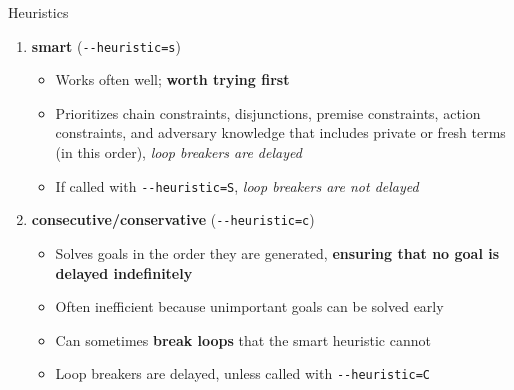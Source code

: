 \documentclass[11pt,aspectratio=169]{beamer}
\begin{document}
\begin{frame}[fragile]{Heuristics}
    \begin{enumerate}
        \item \textbf{smart} (\verb|--heuristic=s|)
        \begin{itemize}
            \item Works often well; \textbf{worth trying first}
            \item Prioritizes chain constraints, disjunctions, premise 
                  constraints, action constraints, and adversary knowledge that 
                  includes private or fresh terms (in this order),
                  \textit{loop breakers are delayed}
            \item If called with \verb|--heuristic=S|,
                  \textit{loop breakers are not delayed}
        \end{itemize}
        \item \textbf{consecutive/conservative} (\verb|--heuristic=c|)
        \begin{itemize}
            \item Solves goals in the order they are generated,
                  \textbf{ensuring that no goal is delayed indefinitely}
            \item Often inefficient because unimportant goals can be solved 
                  early
            \item Can sometimes \textbf{break loops} that the smart heuristic 
                  cannot
            \item Loop breakers are delayed, unless called with
                  \verb|--heuristic=C|
        \end{itemize}
    \end{enumerate}
\end{frame}
\end{document}
